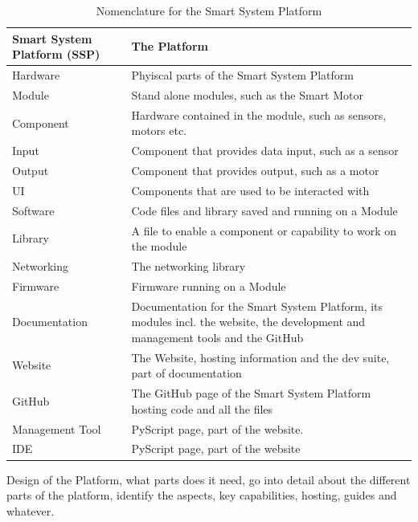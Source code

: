 \begin{table}[H]
    \centering
    \begin{tabular}{|l|l|}
    \hline
        Smart System Platform (SSP) & The Platform \\\hline
        Hardware        & Phyiscal parts of the Smart System Platform \\\hline
        Module          & Stand alone modules, such as the Smart Motor \\\hline
        Component       & Hardware contained in the module, such as sensors, motors etc. \\\hline
        Input           & Component that provides data input, such as a sensor \\\hline
        Output          & Component that provides output, such as a motor \\\hline
        UI              & Components that are used to be interacted with  \\\hline
        Software        & Code files and library saved and running on a Module \\\hline
        Library         & A file to enable a component or capability to work on the module \\\hline
        Networking      & The networking library \\\hline
        Firmware        & Firmware running on a Module \\\hline
        Documentation   & Documentation for the Smart System Platform, its modules incl. the website, the development and management tools and the GitHub \\\hline
        Website         & The Website, hosting information and the dev suite, part of documentation \\\hline
        GitHub          & The GitHub page of the Smart System Platform hosting code and all the files \\\hline
        Management Tool & PyScript page, part of the website. \\\hline
        IDE             & PyScript page, part of the website \\\hline
    \end{tabular}
    \vspace{\ftspace}
    \caption{Nomenclature for the Smart System Platform}
    \label{tab:nomenclature}
\end{table}

Design of the Platform, what parts does it need, go into detail about the different parts of the platform, identify the aspects, key capabilities, hosting, guides and whatever. 

